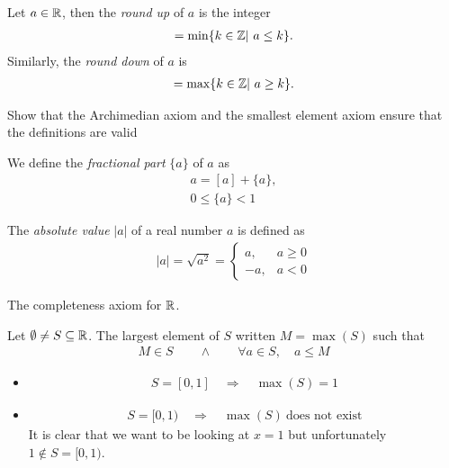 \begin{df}
	Let $a \in \mathbb R$, then the \emph{round up} of $a$ is the integer
	\begin{align*}
	[a] = \min \{ k \in \Z| ~ a \le k \}.
	\end{align*}
	Similarly, the \emph{round down} of $a$ is
	\begin{align*}
	[a] = \max \{ k \in \Z | ~ a \ge k \}.
	\end{align*}
\end{df}

\begin{ec}
	Show that the Archimedian axiom and the smallest element axiom ensure that the definitions are valid
\end{ec}

\begin{df}
	We define the \emph{fractional part} $\{ a \}$ of $a$ as
	\begin{align*}
	a = [a] + \{ a \}, \\
	0 \le \{a \} < 1
	\end{align*}
\end{df}

\begin{df}
	The \emph{absolute value} $|a|$ of a real number $a$ is defined as
	\begin{align*}
	|a| = \sqrt{a^2} = \left\{ \begin{array}{ll}
	a, & a \ge 0 \\
	-a, & a < 0
	\end{array}
	\right.
	\end{align*}
\end{df}

The completeness axiom for $\mathbb R$.
\begin{df}
	Let $\emptyset \neq S \subseteq \mathbb R$. The largest element of $S$ written $M = \max(S)$ such that
	\begin{align*}
	M \in S \qquad \wedge \qquad \forall a \in S, \quad a \le M
	\end{align*}
\end{df}

\begin{ex}
	\begin{itemize}
		\item
		\begin{align*}
		S = [0,1] \quad \Rightarrow \quad \max(S) = 1
		\end{align*}
		\item
		\begin{align*}
		S = [0,1) \quad \Rightarrow \quad \max (S)~ \text{does not exist}
		\end{align*}
		It is clear that we want to be looking at $x=1$ but unfortunately $1 \not\in S = [0,1)$.
	\end{itemize}
\end{ex}

